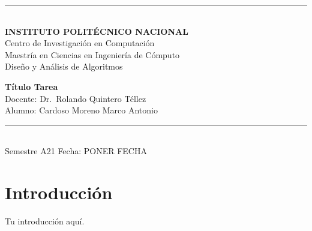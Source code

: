 \documentclass[letterpaper, 12pt]{article}
\begin{document}
\begin{titlepage}
\begin{center}
        \vspace*{2mm}
        \rule{\textwidth}{1.5pt}\\
        \vspace*{5mm}
        \textbf{\Large INSTITUTO POLITÉCNICO NACIONAL}\\
        \vspace*{8mm}
        {\Large Centro de Investigación en Computación}\\
        \vspace{8mm}
        {\Large Maestría en Ciencias en Ingeniería de Cómputo}\\
        \vspace{19mm}
        {\Large Diseño y Análisis de Algoritmos}\\
        \vspace{49mm}




        \textbf{\large Título Tarea}\\





        \vspace*{48mm}
        {\large Docente: Dr.\ Rolando Quintero Téllez}\\
        \vspace*{20mm}
        {\large Alumno: Cardoso Moreno Marco Antonio}\\
        \vspace*{10mm}
        \rule{\textwidth}{1.5pt}\\
        {\large Semestre A21} \hfill {\large Fecha: PONER FECHA}
    \end{center}
\end{titlepage}

\newpage
\thispagestyle{empty}

\newpage
{}


\clearpage
\tableofcontents

\clearpage
{}
\listoffigures

\clearpage
{}
\listoftables

\clearpage
{}
\section*{Introducción}
\noindent
Tu introducción aquí.
\end{document}
